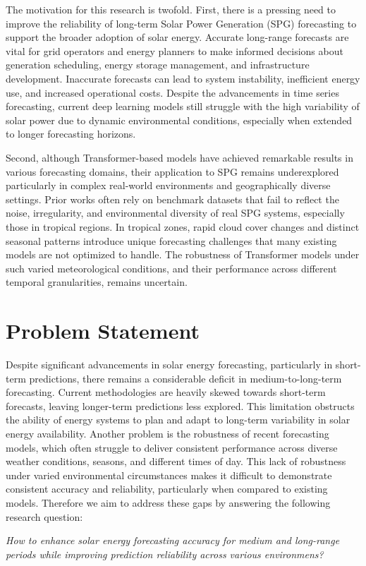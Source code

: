\documentclass[12pt]{uomthesis}
\begin{document}
The motivation for this research is twofold. First, there is a pressing need to improve the reliability of long-term Solar Power Generation (SPG) forecasting to support the broader adoption of solar energy. Accurate long-range forecasts are vital for grid operators and energy planners to make informed decisions about generation scheduling, energy storage management, and infrastructure development. Inaccurate forecasts can lead to system instability, inefficient energy use, and increased operational costs. Despite the advancements in time series forecasting, current deep learning models still struggle with the high variability of solar power due to dynamic environmental conditions, especially when extended to longer forecasting horizons.

Second, although Transformer-based models have achieved remarkable results in various forecasting domains, their application to SPG remains underexplored particularly in complex real-world environments and geographically diverse settings. Prior works often rely on benchmark datasets that fail to reflect the noise, irregularity, and environmental diversity of real SPG systems, especially those in tropical regions. In tropical zones, rapid cloud cover changes and distinct seasonal patterns introduce unique forecasting challenges that many existing models are not optimized to handle. The robustness of Transformer models under such varied meteorological conditions, and their performance across different temporal granularities, remains uncertain.

\section{Problem Statement}

Despite significant advancements in solar energy forecasting, particularly in short-term predictions, there remains a considerable deficit in medium-to-long-term forecasting. Current methodologies are heavily skewed towards short-term forecasts, leaving longer-term predictions less explored. This limitation obstructs the ability of energy systems to plan and adapt to long-term variability in solar energy availability. Another problem is the robustness of recent forecasting models, which often struggle to deliver consistent performance across diverse weather conditions, seasons, and different times of day. This lack of robustness under varied environmental circumstances makes it difficult to demonstrate consistent accuracy and reliability, particularly when compared to existing models. Therefore we aim to address these gaps by answering the following research question:
\begin{center}
\emph{How to enhance solar energy forecasting accuracy for medium and long-range
periods while improving prediction reliability across various environmens?}
\end{center}
\end{document}

